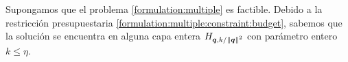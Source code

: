 
Supongamos que el problema \eqref{formulation:multiple} es factible. Debido a la restricción
presupuestaria \eqref{formulation:multiple:constraint:budget}, sabemos que la solución se encuentra
en alguna capa entera $H_{\boldsymbol{q}, k/\left\lVert \boldsymbol{q} \right\rVert^{2}}$ con parámetro entero $k \leq \eta$.

